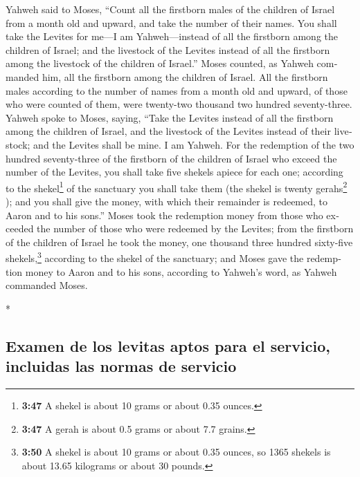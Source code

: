 \begin{paracol}{2}
\begin{otherlanguage}{english}
 Yahweh said to Moses, ``Count all the firstborn males of
the children of Israel from a month old and upward, and take the number
of their names.  You shall take the Levites for me---I am
Yahweh---instead of all the firstborn among the children of Israel; and
the livestock of the Levites instead of all the firstborn among the
livestock of the children of Israel.''  Moses counted, as
Yahweh commanded him, all the firstborn among the children of Israel.
 All the firstborn males according to the number of names
from a month old and upward, of those who were counted of them, were
twenty-two thousand two hundred seventy-three.  Yahweh
spoke to Moses, saying,  ``Take the Levites instead of
all the firstborn among the children of Israel, and the livestock of the
Levites instead of their livestock; and the Levites shall be mine. I am
Yahweh.  For the redemption of the two hundred
seventy-three of the firstborn of the children of Israel who exceed the
number of the Levites,  you shall take five shekels
apiece for each one; according to the shekel\footnote{\textbf{3:47} A
  shekel is about 10 grams or about 0.35 ounces.} of the sanctuary you
shall take them (the shekel is twenty gerahs\footnote{\textbf{3:47} A
  gerah is about 0.5 grams or about 7.7 grains.} );  and
you shall give the money, with which their remainder is redeemed, to
Aaron and to his sons.''  Moses took the redemption money
from those who exceeded the number of those who were redeemed by the
Levites;  from the firstborn of the children of Israel he
took the money, one thousand three hundred sixty-five
shekels,\footnote{\textbf{3:50} A shekel is about 10 grams or about 0.35
  ounces, so 1365 shekels is about 13.65 kilograms or about 30 pounds.}
according to the shekel of the sanctuary;  and Moses gave
the redemption money to Aaron and to his sons, according to Yahweh's
word, as Yahweh commanded Moses.

\end{otherlanguage}

\switchcolumn[0]*

\hypertarget{examen-de-los-levitas-aptos-para-el-servicio-incluidas-las-normas-de-servicio}{%
\subsection{Examen de los levitas aptos para el servicio, incluidas las
normas de
servicio}\label{examen-de-los-levitas-aptos-para-el-servicio-incluidas-las-normas-de-servicio}}


\end{paracol}
